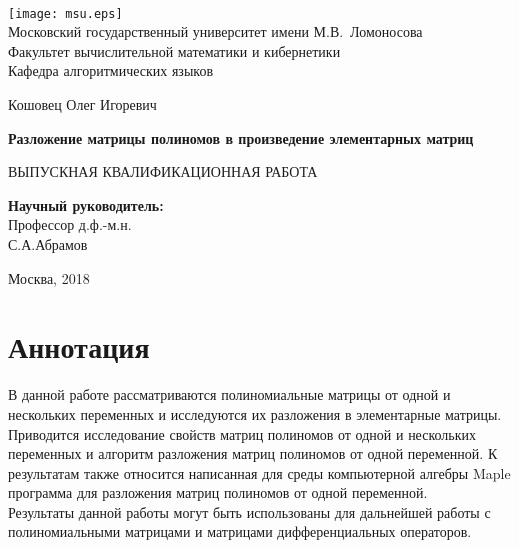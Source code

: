 \documentclass[14pt, a4paper]{extreport}
\begin{document}
\thispagestyle{empty}

\begin{center}
	\ \vspace{-3cm}

	\texttt{[image: msu.eps]}\\
	{Московский государственный университет имени М.В.~Ломоносова}\\
	Факультет вычислительной математики и кибернетики\\
	Кафедра алгоритмических языков

	\vspace{5cm}

	{\Large Кошовец Олег Игоревич}

	\vspace{1cm}

	{\Large\bfseries
	Разложение матрицы полиномов в произведение элементарных матриц\\}

	\vspace{1cm}

	{\large ВЫПУСКНАЯ КВАЛИФИКАЦИОННАЯ РАБОТА}
\end{center}

\vfill

\begin{flushright}
	\textbf{Научный руководитель:}\\
	Профессор д.ф.-м.н.\\
	С.А.Абрамов
\end{flushright}

\vfill


\begin{center}
	Москва, 2018
\end{center}

\newpage
\renewcommand{\contentsname}{Содержание}
\tableofcontents
\clearpage
\newpage

\chapter{Аннотация}
	В данной работе рассматриваются полиномиальные матрицы от одной и нескольких переменных
	и исследуются их разложения в элементарные матрицы. Приводится исследование свойств матриц полиномов
	от одной и нескольких переменных и алгоритм разложения матриц полиномов от одной переменной.
	К результатам также относится написанная для среды компьютерной алгебры Maple программа для разложения
	матриц полиномов от одной переменной.\\
	Результаты данной работы могут быть использованы для дальнейшей работы с полиномиальными матрицами
	и матрицами дифференциальных операторов.
\end{document}

